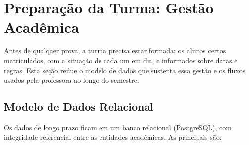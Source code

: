 \section{Preparação da Turma: Gestão Acadêmica}
\label{sec:gestao-academica}

Antes de qualquer prova, a turma precisa estar formada: os alunos certos matriculados, com a situação de cada um em dia, e informados sobre datas e regras. Esta seção reúne o modelo de dados que sustenta essa gestão e os fluxos usados pela professora ao longo do semestre.

\subsection{Modelo de Dados Relacional}
\label{sec:modelo-dados}

Os dados de longo prazo ficam em um banco relacional (PostgreSQL), com integridade referencial entre as entidades acadêmicas. As principais são:

